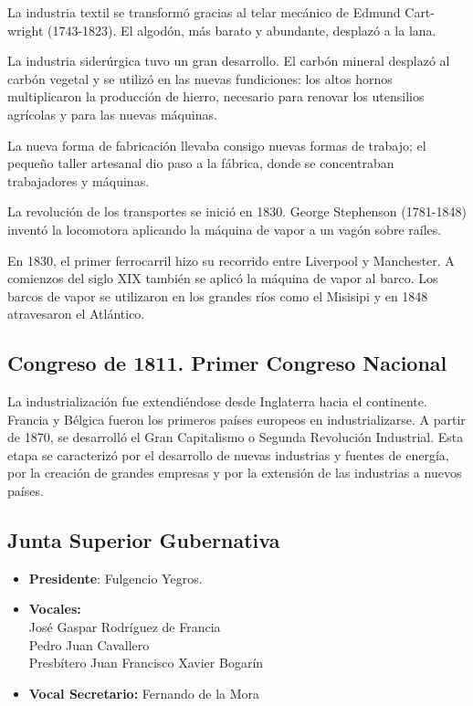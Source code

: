 \documentclass{article}
\begin{document}
{  La industria textil se transformó gracias al telar mecánico de Edmund Cart-\\wright (1743-1823). El algodón, más barato y abundante, desplazó a la lana.

  La industria siderúrgica tuvo un gran desarrollo. El carbón mineral desplazó al carbón vegetal y se utilizó en las nuevas fundiciones: los altos hornos multiplicaron la producción de hierro, necesario para renovar los utensilios agrícolas y para las nuevas máquinas.

  La nueva forma de fabricación llevaba consigo nuevas formas de trabajo; el pequeño taller artesanal dio paso a la fábrica, donde se concentraban trabajadores y máquinas.

  La revolución de los transportes se inició en 1830. George Stephenson (1781-1848) inventó la locomotora aplicando la máquina de vapor a un vagón sobre raíles.

  En 1830, el primer ferrocarril hizo su recorrido entre Liverpool y Manchester. A comienzos del siglo XIX también se aplicó la máquina de vapor al barco. Los barcos de vapor se utilizaron en los grandes ríos como el Misisipi y en 1848 atravesaron el Atlántico.

  \subsection*{Congreso de 1811. Primer Congreso Nacional}
  La industrialización fue extendiéndose desde Inglaterra hacia el continente. Francia y Bélgica fueron los primeros países europeos en industrializarse. A partir de 1870, se desarrolló el Gran Capitalismo o Segunda Revolución Industrial. Esta etapa se caracterizó por el desarrollo de nuevas industrias y fuentes de energía, por la creación de grandes empresas y por la extensión de las industrias a nuevos países.

  \subsection*{Junta Superior Gubernativa}

  \begin{itemize}
    \item \textbf{Presidente}: Fulgencio Yegros.
    \item \textbf{Vocales:}\\
      José Gaspar Rodríguez de Francia\\
      Pedro Juan Cavallero\\
      Presbítero Juan Francisco Xavier Bogarín\\
    \item \textbf{Vocal Secretario:} Fernando de la Mora
  \end{itemize}
}
\end{document}
